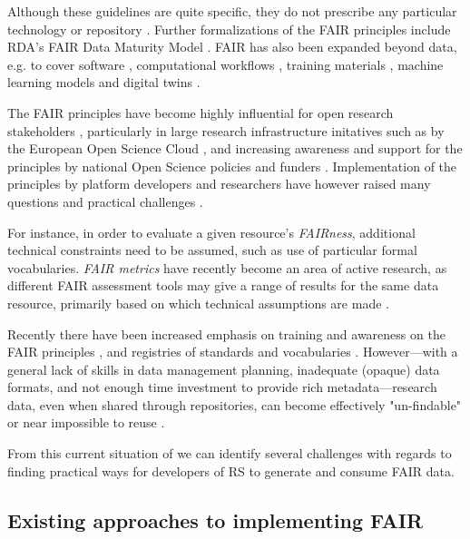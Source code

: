 Although these guidelines are quite specific, they do not prescribe any particular technology or repository \cite{Mons 2017}. Further formalizations of the FAIR principles include RDA's FAIR Data Maturity Model \cite{FAIR Maturity 2020,Bahui 2020}. FAIR has also been expanded beyond data, e.g. to cover software \cite{Katz 2021b}, computational workflows \cite{Goble 2020}, training materials \cite{Garcia 2020a}, machine learning models \cite{Duarte 2023} and digital twins \cite{Schultes 2022}. 

The FAIR principles have become highly influential for open research stakeholders \cite{Jacobsen 2020}, particularly in large research infrastructure initatives such as by the European Open Science Cloud  \cite{Schouppe 2018}, and increasing awareness and support for the principles by national Open Science policies and funders \cite{Davidson 2019,Davidson 2022}.
Implementation of the principles by platform developers and researchers have however raised many questions and practical challenges \cite{Mons 2020,Riungu-Kalliosaari 2022}. 

For instance, in order to evaluate a given resource's \emph{FAIRness}, additional technical constraints need to be assumed, such as use of particular formal vocabularies. \emph{FAIR metrics} \cite{Wilkinson 2018,Devaraju 2021} have recently become an area of active research, as different FAIR assessment tools may give a range of results for the same data resource, primarily based on which technical assumptions are made \cite{Wilkinson 2022a,Verburg 2023}.

Recently there have been increased emphasis on training and awareness on the FAIR principles \cite{Shanahan 2021,Rocca-Serra 2023}, and registries of standards and vocabularies \cite{Sansone 2019}.
However---with a general lack of skills in data management planning, inadequate (opaque) data formats, and not enough time investment to provide rich metadata---research data, even when shared through repositories, can become effectively "un-findable" or near impossible to reuse \cite{Carballo-Garcia 2022}.

From this current situation of we can identify several challenges with regards to finding practical ways for developers of \acrlong{RS} to generate and consume FAIR data.



\subsection{Existing approaches to implementing FAIR}

